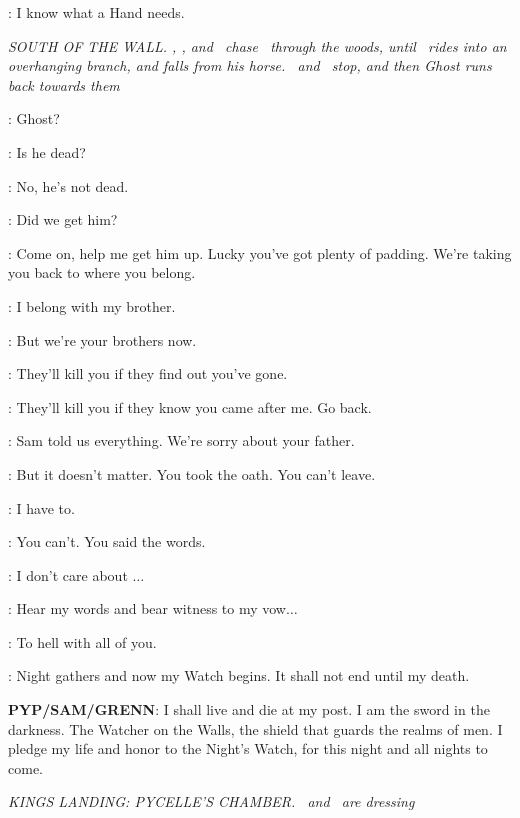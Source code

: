 \SHAE: I know what a Hand needs. 


\scene

\textit{SOUTH OF THE WALL.  \SAM, \GRENN, and \PYP ~chase \JON ~through the woods, until \SAM ~rides into an overhanging branch, and falls from his horse.  \GRENN ~and \PYP ~stop, and then Ghost runs back towards them} 

\JON: Ghost? 

\GRENN: Is he dead? 

\PYP: No, he's not dead. 

\SAM: Did we get him? 

\PYP: Come on, help me get him up. Lucky you've got plenty of padding.  We're taking you back to where you belong. 

\JON: I belong with my brother. 

\SAM: But we're your brothers now. 

\GRENN: They'll kill you if they find out you've gone. 

\JON: They'll kill you if they know you came after me. Go back. 

\PYP: Sam told us everything. We're sorry about your father. 

\GRENN: But it doesn't matter. You took the oath. You can't leave. 

\JON: I have to. 

\GRENN: You can't. You said the words. 

\JON: I don't care about $\ldots$  

\SAM: Hear my words and bear witness to my vow$\ldots$ 

\JON: To hell with all of you. 

\PYP: Night gathers and now my Watch begins. It shall not end until my death. 

\textbf{PYP/SAM/GRENN}: I shall live and die at my post. I am the sword in the darkness. The Watcher on the Walls, the shield that guards the realms of men. I pledge my life and honor to the Night's Watch, for this night and all nights to come. 


\scene

\textit{KINGS LANDING: PYCELLE'S CHAMBER.  \PYCELLE ~and \ROS ~are dressing} 

